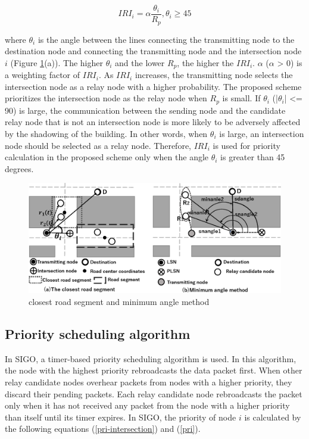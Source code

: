 \documentclass{comex}
\begin{document}
\begin{equation}
\label{IRI}
IRI_i =  \alpha\frac{\theta_i}{R_p}, \theta_i \geq 45
\end{equation}

where $\theta_i$ is the angle between the lines connecting the transmitting node to the destination node and  connecting the transmitting node and the intersection node $i$ (Figure \ref{fig:minagnle}(a)).
The higher $\theta_i$  and the lower  $R_p$, the higher the $IRI_i$.
$\alpha$ ($\alpha$ > 0) is a weighting factor of $IRI_i$.
As $IRI_i$ increases, the transmitting node selects the intersection node as a relay node with a higher probability. 
The proposed scheme prioritizes the intersection node as the relay node when $R_p$ is small. 
If $\theta_i$ (|$\theta_i$| <= 90) is large, the communication between the sending node and the candidate relay node that is not an intersection node is more likely to be adversely affected by the shadowing of the building. In other words, when $\theta_i$ is large, an intersection node should be selected as a relay node. Therefore, $IRI_i$ is used for priority calculation in the proposed scheme only when the angle $\theta_i$ is greater than 45 degrees.
 
 

\begin{figure}[!ht]
\centering
\includegraphics[width=120mm]{figures/minangle.eps}
\caption{closest road segment and minimum angle method }
\label{fig:minagnle}
\end{figure}

\subsection{Priority scheduling algorithm}
In SIGO, a timer-based priority scheduling algorithm is used. 
In this algorithm, the node with the highest priority rebroadcasts the data packet first. 
When other relay candidate nodes overhear packets from nodes with a higher priority, they discard their pending packets. Each relay candidate node rebroadcasts the packet only when it has not received any packet from the node with a higher priority than itself until its timer expires.
In SIGO, the priority of node $i$ is calculated by the following equations (\ref{pri-intersection}) and (\ref{pri}).
\end{document}
